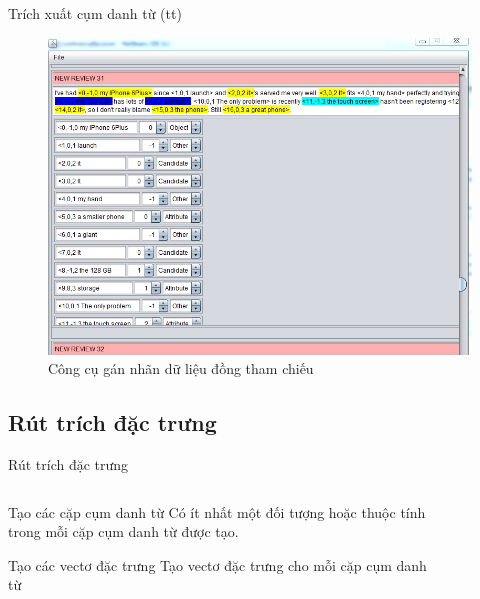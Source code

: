 \documentclass[9pt,xcolor=table,hyperref=unicode]{beamer}
\begin{document}
	\begin{frame}{Trích xuất cụm danh từ (tt)}
		\begin{figure}[H]
			\centering							
			\includegraphics[scale=0.45]{images/markup_tool}				
			\caption{Công cụ gán nhãn dữ liệu đồng tham chiếu}				
		\end{figure}
	\end{frame}

	\subsection{Rút trích đặc trưng}
	\begin{frame}{Rút trích đặc trưng}				
		\begin{columns}[t]
			\begin{column}{0.7\textwidth}
			   	\begin{block}{Tạo các cặp cụm danh từ}
					Có ít nhất một đối tượng hoặc thuộc tính trong mỗi cặp cụm danh từ được tạo.
				\end{block}
				\begin{block}{Tạo các vectơ đặc trưng}										
					Tạo vectơ đặc trưng cho mỗi cặp cụm danh từ
				\end{block}
			\end{column}
			\begin{column}{0.3\textwidth}  %
			 	\begin{figure}[H]
					\fontsize{13pt}{13}\selectfont
					\centering				
					\resizebox{30mm}{!}{}	
				\end{figure}
			\end{column}
		\end{columns}
		\begin{columns}[t]			
			\begin{column}{\textwidth}				
			   	\begin{figure}[H]
					\LARGE 
					\resizebox{100mm}{!}{}										
				\end{figure}
			\end{column}			
		\end{columns}
	\end{frame}	
\end{document}
